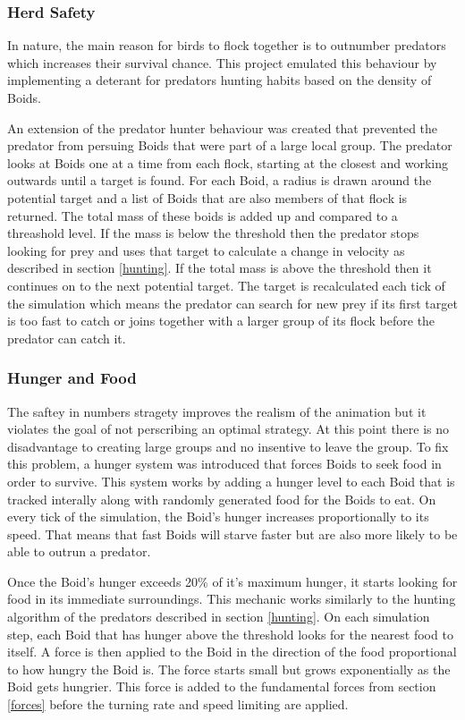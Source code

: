 \documentclass{egpubl}
\begin{document}
\subsubsection{Herd Safety}
\label{herdImmunity}
In nature, the main reason for birds to flock together is to outnumber predators which increases their survival chance. This project emulated this behaviour by implementing a deterant for predators hunting habits based on the density of Boids.
\par
An extension of the predator hunter behaviour was created that prevented the predator from persuing Boids that were part of a large local group. The predator looks at Boids one at a time from each flock, starting at the closest and working outwards until a target is found. For each Boid, a radius is drawn around the potential target and a list of Boids that are also members of that flock is returned. The total mass of these boids is added up and compared to a threashold level. If the mass is below the threshold then the predator stops looking for prey and uses that target to calculate a change in velocity as described in section \ref{hunting}. If the total mass is above the threshold then it continues on to the next potential target. The target is recalculated each tick of the simulation which means the predator can search for new prey if its first target is too fast to catch or joins together with a larger group of its flock before the predator can catch it.
\subsubsection{Hunger and Food}
\label{hunger}
The saftey in numbers stragety improves the realism of the animation but it violates the goal of not perscribing an optimal strategy. At this point there is no disadvantage to creating large groups and no insentive to leave the group. To fix this problem, a hunger system was introduced that forces Boids to seek food in order to survive. This system works by adding a hunger level to each Boid that is tracked interally along with randomly generated food for the Boids to eat. On every tick of the simulation, the Boid's hunger increases proportionally to its speed. That means that fast Boids will starve faster but are also more likely to be able to outrun a predator. 
\par
Once the Boid's hunger exceeds 20\% of it's maximum hunger, it starts looking for food in its immediate surroundings. This mechanic works similarly to the hunting algorithm of the predators described in section \ref{hunting}. On each simulation step, each Boid that has hunger above the threshold looks for the nearest food to itself. A force is then applied to the Boid in the direction of the food proportional to how hungry the Boid is. The force starts small but grows exponentially as the Boid gets hungrier. This force is added to the fundamental forces from section \ref{forces} before the turning rate and speed limiting are applied.
\end{document}
